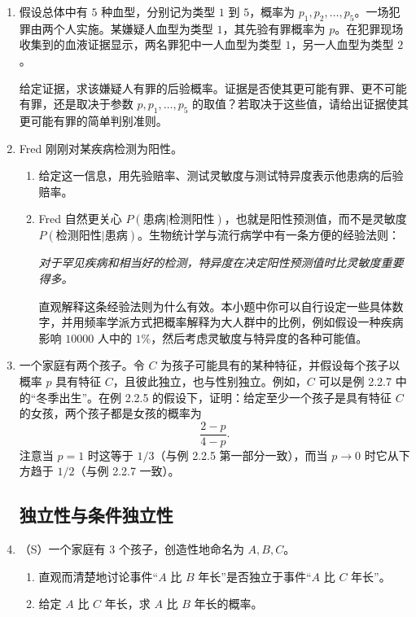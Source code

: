 \documentclass[UTF8, 12pt, fontset=fandol, oneside]{ctexart}
\begin{document}
\begin{enumerate}
  \item 假设总体中有 $5$ 种血型，分别记为类型 $1$ 到 $5$，概率为 $p_1,p_2,\ldots,p_5$。一场犯罪由两个人实施。某嫌疑人血型为类型 $1$，其先验有罪概率为 $p$。在犯罪现场收集到的血液证据显示，两名罪犯中一人血型为类型 $1$，另一人血型为类型 $2$。

  给定证据，求该嫌疑人有罪的后验概率。证据是否使其更可能有罪、更不可能有罪，还是取决于参数 $p,p_1,\ldots,p_5$ 的取值？若取决于这些值，请给出证据使其更可能有罪的简单判别准则。

  \item Fred 刚刚对某疾病检测为阳性。
  \begin{enumerate}
    \item 给定这一信息，用先验赔率、测试灵敏度与测试特异度表示他患病的后验赔率。
    \item Fred 自然更关心 $P(\text{患病}|\text{检测阳性})$，也就是阳性预测值，而不是灵敏度 $P(\text{检测阳性}|\text{患病})$。生物统计学与流行病学中有一条方便的经验法则：

    \textit{对于罕见疾病和相当好的检测，特异度在决定阳性预测值时比灵敏度重要得多。}

    直观解释这条经验法则为什么有效。本小题中你可以自行设定一些具体数字，并用频率学派方式把概率解释为大人群中的比例，例如假设一种疾病影响 $10000$ 人中的 $1\%$，然后考虑灵敏度与特异度的各种可能值。
  \end{enumerate}

  \item 一个家庭有两个孩子。令 $C$ 为孩子可能具有的某种特征，并假设每个孩子以概率 $p$ 具有特征 $C$，且彼此独立，也与性别独立。例如，$C$ 可以是例 2.2.7 中的“冬季出生”。在例 2.2.5 的假设下，证明：给定至少一个孩子是具有特征 $C$ 的女孩，两个孩子都是女孩的概率为
  \[
    \frac{2-p}{4-p}.
  \]
  注意当 $p=1$ 时这等于 $1/3$（与例 2.2.5 第一部分一致），而当 $p\to 0$ 时它从下方趋于 $1/2$（与例 2.2.7 一致）。

\subsection*{独立性与条件独立性}

  \item （S）一个家庭有 $3$ 个孩子，创造性地命名为 $A,B,C$。
  \begin{enumerate}
    \item 直观而清楚地讨论事件“$A$ 比 $B$ 年长”是否独立于事件“$A$ 比 $C$ 年长”。
    \item 给定 $A$ 比 $C$ 年长，求 $A$ 比 $B$ 年长的概率。
  \end{enumerate}


\end{enumerate}
\end{document}
